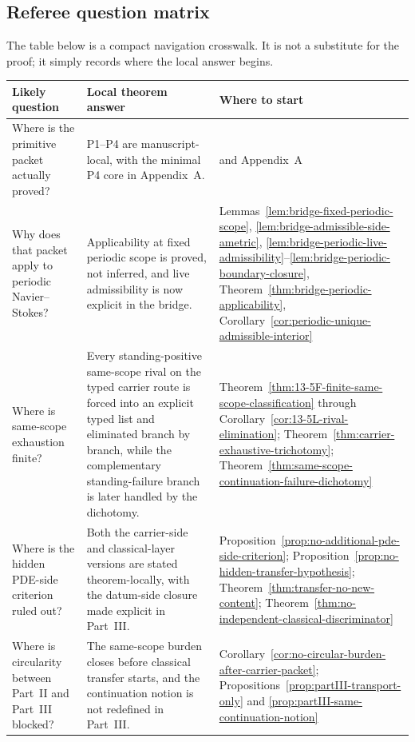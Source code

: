 \subsection*{Referee question matrix}
The table below is a compact navigation crosswalk. It is not a substitute for the proof; it simply records where the local answer begins.

\begin{center}
\footnotesize
\renewcommand{\arraystretch}{1.16}
\setlength{\tabcolsep}{4pt}
\begin{tabularx}{0.98\textwidth}{@{}L{0.24\textwidth}L{0.46\textwidth}Y@{}}
\toprule
\textbf{Likely question} & \textbf{Local theorem answer} & \textbf{Where to start}\\
\midrule
Where is the primitive packet actually proved? & P1--P4 are manuscript-local, with the minimal P4 core in Appendix~A. & \StructuralPacketRef{} and Appendix~A\\
Why does that packet apply to periodic Navier--Stokes? & Applicability at fixed periodic scope is proved, not inferred, and live admissibility is now explicit in the bridge. & Lemmas~\ref{lem:bridge-fixed-periodic-scope}, \ref{lem:bridge-admissible-side-ametric}, \ref{lem:bridge-periodic-live-admissibility}--\ref{lem:bridge-periodic-boundary-closure}, Theorem~\ref{thm:bridge-periodic-applicability}, Corollary~\ref{cor:periodic-unique-admissible-interior}\\
Where is same-scope exhaustion finite? & Every standing-positive same-scope rival on the typed carrier route is forced into an explicit typed list and eliminated branch by branch, while the complementary standing-failure branch is later handled by the dichotomy. & Theorem~\ref{thm:13-5F-finite-same-scope-classification} through Corollary~\ref{cor:13-5L-rival-elimination}; Theorem~\ref{thm:carrier-exhaustive-trichotomy}; Theorem~\ref{thm:same-scope-continuation-failure-dichotomy}\\
Where is the hidden PDE-side criterion ruled out? & Both the carrier-side and classical-layer versions are stated theorem-locally, with the datum-side closure made explicit in Part~III. & Proposition~\ref{prop:no-additional-pde-side-criterion}; Proposition~\ref{prop:no-hidden-transfer-hypothesis}; Theorem~\ref{thm:transfer-no-new-content}; Theorem~\ref{thm:no-independent-classical-discriminator}\\
Where is circularity between Part~II and Part~III blocked? & The same-scope burden closes before classical transfer starts, and the continuation notion is not redefined in Part~III. & Corollary~\ref{cor:no-circular-burden-after-carrier-packet}; Propositions~\ref{prop:partIII-transport-only} and \ref{prop:partIII-same-continuation-notion}\\

\end{tabularx}
\end{center}
